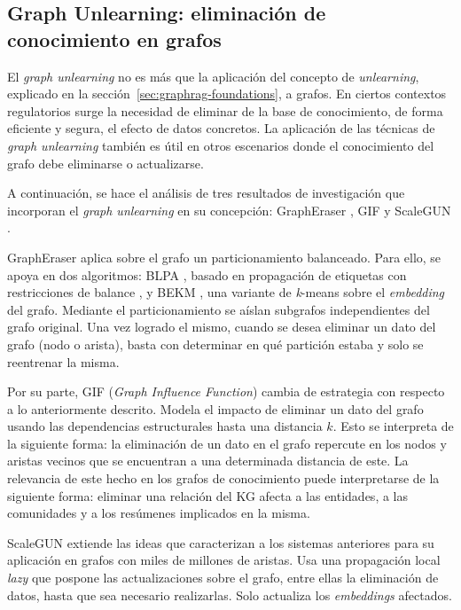 \subsection{Graph Unlearning: eliminación de conocimiento en grafos}\label{subsec:graph-unlearning}

El \emph{graph unlearning} no es más que la aplicación del concepto de \emph{unlearning}, explicado en la sección~\ref{sec:graphrag-foundations}, a grafos. En ciertos contextos regulatorios surge la necesidad de eliminar de la base de conocimiento, de forma eficiente y segura, el efecto de datos concretos. La aplicación de las técnicas de \emph{graph unlearning} también es útil en otros escenarios donde el conocimiento del grafo debe eliminarse o actualizarse.

A continuación, se hace el análisis de tres resultados de investigación que incorporan el \emph{graph unlearning} en su concepción: GraphEraser \cite{graph_unlearning2022}, GIF \cite{gif2023} y ScaleGUN \cite{scalegun2025}.

GraphEraser aplica sobre el grafo un particionamiento balanceado. Para ello, se apoya en dos algoritmos: BLPA \cite{blpa_placeholder}, basado en propagación de etiquetas con restricciones de balance \cite{label_propagation_placeholder}, y BEKM \cite{bekm_placeholder}, una variante de \emph{k}-means \cite{kmeans_placeholder} sobre el \emph{embedding} del grafo. Mediante el particionamiento se aíslan subgrafos independientes del grafo original. Una vez logrado el mismo, cuando se desea eliminar un dato del grafo (nodo o arista), basta con determinar en qué partición estaba y solo se reentrenar la misma.

Por su parte, GIF (\emph{Graph Influence Function}) cambia de estrategia con respecto a lo anteriormente descrito. Modela el impacto de eliminar un dato del grafo usando las dependencias estructurales hasta una distancia $k$. Esto se interpreta de la siguiente forma: la eliminación de un dato en el grafo repercute en los nodos y aristas vecinos que se encuentran a una determinada distancia de este. La relevancia de este hecho en los grafos de conocimiento puede interpretarse de la siguiente forma: eliminar una relación del KG afecta a las entidades, a las comunidades y a los resúmenes implicados en la misma.

ScaleGUN extiende las ideas que caracterizan a los sistemas anteriores para su aplicación en grafos con miles de millones de aristas. Usa una propagación local \emph{lazy} que pospone las actualizaciones sobre el grafo, entre ellas la eliminación de datos, hasta que sea necesario realizarlas. Solo actualiza los \emph{embeddings} afectados.

